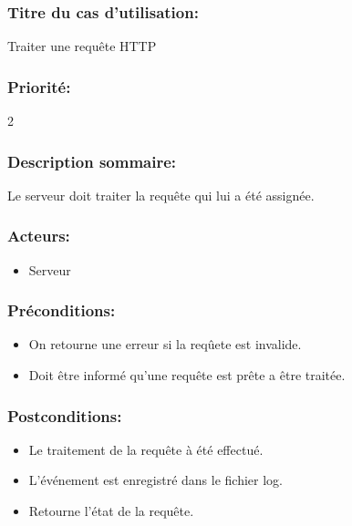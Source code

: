 \documentclass{scrreprt}
\begin{document}
\subsubsection{Titre du cas d'utilisation:} Traiter une requête HTTP
\subsubsection{Priorité:} 2
\subsubsection{Description sommaire:} Le serveur doit traiter la requête qui lui a été assignée.
\subsubsection{Acteurs:}
\begin{itemize}
    \item Serveur
\end{itemize}
\subsubsection{Préconditions:}
\begin{itemize}
    \item On retourne une erreur si la reqûete est invalide.
    \item Doit être informé qu'une requête est prête a être traitée.  
\end{itemize} 
\subsubsection{Postconditions:}
\begin{itemize}
    \item Le traitement de la requête à été effectué.
    \item L'événement est enregistré dans le fichier log. 
    \item Retourne l'état de la requête.    
\end{itemize} 
\end{document}
